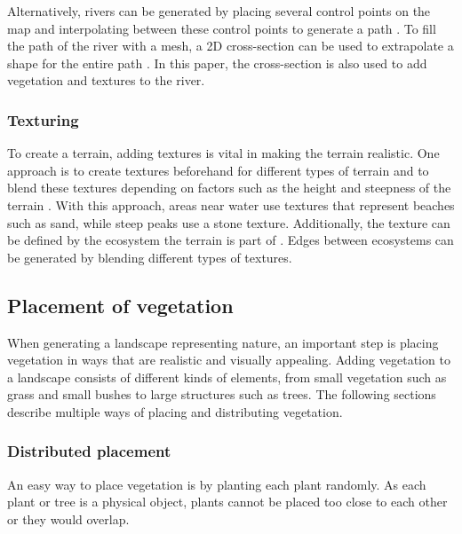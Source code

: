 \documentclass{article}
\begin{document}
Alternatively, rivers can be generated by placing several control points on the map and interpolating between these control points to generate a path \cite{smelik_declarative_2011}. To fill the path of the river with a mesh, a 2D cross-section can be used to extrapolate a shape for the entire path \cite{huijser_procedural_2010}. In this paper, the cross-section is also used to add vegetation and textures to the river.





\subsubsection{Texturing}
To create a terrain, adding textures is vital in making the terrain realistic. One approach is to create textures beforehand for different types of terrain and to blend these textures depending on factors such as the height and steepness of the terrain \cite{schneider_real-time_2006} \cite{kahoun_realtime_2013}. With this approach, areas near water use textures that represent beaches such as sand, while steep peaks use a stone texture. Additionally, the texture can be defined by the ecosystem the terrain is part of \cite{hammes_modeling_2001}. Edges between ecosystems can be generated by blending different types of textures.

\subsection{Placement of vegetation}
When generating a landscape representing nature, an important step is placing vegetation in ways that are realistic and visually appealing. Adding vegetation to a landscape consists of different kinds of elements, from small vegetation such as grass and small bushes to large structures such as trees. The following sections describe multiple ways of placing and distributing vegetation.

\subsubsection{Distributed placement}
An easy way to place vegetation is by planting each plant randomly. As each plant or tree is a physical object, plants cannot be placed too close to each other or they would overlap.
\end{document}
